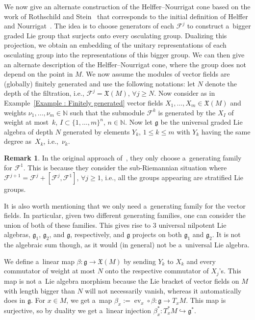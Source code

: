 \documentclass[pdftex]{sigma}
\newcommand{\N}{\mathbb N} %
\newcommand{\F}{\mathcal{F}} %
\newcommand{\g}{\mathfrak{g}} %
\newcommand{\ev}{\operatorname{ev}} %
\numberwithin{equation}{section}
\theoremstyle{definition}
\newtheorem{rem}[thm]{Remark}
\begin{document}
We now give an alternate construction of the Helffer--Nourrigat cone based on the work of Rothschild and Stein~\cite{RothschildStein} that corresponds to the initial definition of Helffer and Nourrigat~\cite{HelfferNourrigatPaper}. The idea is to choose generators of each $\F^j$ to construct a~bigger graded Lie group that surjects onto every osculating group. Dualizing this projection, we obtain an embedding of the unitary representations of each osculating group into the representations of this bigger group. We can then give an alternate description of the Helffer--Nourrigat cone, where the group does not depend on the point in $M$. We now assume the modules of vector fields are (globally) finitely generated and use the following notations: let $N$ denote the depth of the filtration, i.e., $\F^j = \mathfrak{X}(M)$, $\forall j \geq N$. Now consider as in Example~\ref{Example : Finitely generated} vector fields $X_1,\dots,X_m \in \mathfrak{X}(M)$ and weights $\nu_1,\dots,\nu_m \in \N$ such that the submodule $\F^k$ is generated by the $X_I$ of weight at most~$k$, $I \subset \{1,\dots,m\}^n$, $n\in \N$. Now let $\mathfrak{g}$ be the universal graded Lie algebra of depth $N$ generated by elements $Y_k$, $1\leq k \leq m $ with $Y_k$ having the same degree as~$X_k$, i.e.,~$\nu_k$.

\begin{rem}
 In the original approach of~\cite{RothschildStein}, they only choose a~generating family for $\F^1$. This is because they consider the sub-Riemannian situation where $\F^{j+1} = \F^j + [\F^j,\F^1]$, $\forall j \geq 1$, i.e., all the groups appearing are stratified Lie groups.

 It is also worth mentioning that we only need a~generating family for the vector fields. In particular, given two different generating families, one can consider the union of both of these families. This gives rise to 3 universal nilpotent Lie algebras, $\g_1$, $\g_2$, and $\g$, respectively, and $\g$ projects on both $\g_1$ and $\g_2$. It is not the algebraic sum though, as it would (in general) not be a~universal Lie algebra.
\end{rem}

We define a~linear map $\beta \colon \g \to \mathfrak{X}(M)$ by sending $Y_k$ to $X_k$ and every commutator of weight at most $N$ onto the respective commutator of $X_j$'s. This map is not a~Lie algebra morphism because the Lie bracket of vector fields on $M$ with length bigger than $N$ will not necessarily vanish, whereas it automatically does in $\g$.
For $x \in M$, we get a~map $\beta_x := \ev_x \circ \beta \colon \g \to T_xM$. This map is surjective, so by duality we get a~linear injection $\beta_x^* \colon T^*_xM \hookrightarrow \g^*$.
\end{document}

